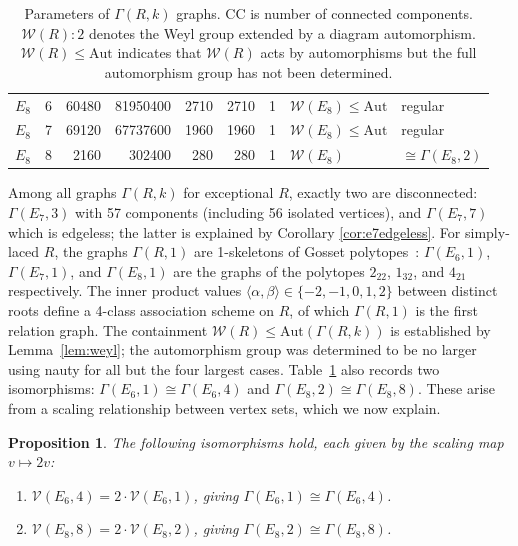 \documentclass[11pt]{article}
\newtheorem{proposition}[theorem]{Proposition}
\newcommand{\W}{\mathcal{W}}
\begin{document}
\begin{table}[h]
\begin{tabular}{llrrrrrll}
$E_8$ & 6 & 60480 & 81950400 & 2710 & 2710 & 1 & $\W(E_8) \leq \mathrm{Aut}$ & regular \\
$E_8$ & 7 & 69120 & 67737600 & 1960 & 1960 & 1 & $\W(E_8) \leq \mathrm{Aut}$ & regular \\
$E_8$ & 8 & 2160 & 302400 & 280 & 280 & 1 & $\W(E_8)$ & $\cong \Gamma(E_8, 2)$ \\
\bottomrule
\end{tabular}
\caption{Parameters of $\Gamma(R, k)$ graphs. CC is number of connected components. $\W(R){:}2$ denotes the Weyl group extended by a diagram automorphism. $\W(R) \leq \mathrm{Aut}$ indicates that $\W(R)$ acts by automorphisms but the full automorphism group has not been determined.}
\label{tab:properties}
\end{table}

Among all graphs $\Gamma(R,k)$ for exceptional $R$, exactly two are disconnected: $\Gamma(E_7, 3)$ with 57 components (including 56 isolated vertices), and $\Gamma(E_7, 7)$ which is edgeless; the latter is explained by Corollary \ref{cor:e7edgeless}. For simply-laced $R$, the graphs $\Gamma(R, 1)$ are 1-skeletons of Gosset polytopes~\cite{Coxeter}: $\Gamma(E_6, 1)$, $\Gamma(E_7, 1)$, and $\Gamma(E_8, 1)$ are the graphs of the polytopes $2_{22}$, $1_{32}$, and $4_{21}$ respectively. The inner product values $\langle \alpha, \beta \rangle \in \{-2, -1, 0, 1, 2\}$ between distinct roots define a 4-class association scheme on $R$, of which $\Gamma(R, 1)$ is the first relation graph. The containment $\W(R) \leq \mathrm{Aut}(\Gamma(R,k))$ is established by Lemma~\ref{lem:weyl}; the automorphism group was determined to be no larger using nauty for all but the four largest cases. Table~\ref{tab:properties} also records two isomorphisms: $\Gamma(E_6, 1) \cong \Gamma(E_6, 4)$ and $\Gamma(E_8, 2) \cong \Gamma(E_8, 8)$. These arise from a scaling relationship between vertex sets, which we now explain.

\begin{proposition}\label{prop:duality}
The following isomorphisms hold, each given by the scaling map $v \mapsto 2v$:
\begin{enumerate}
    \item $\mathcal{V}(E_6, 4) = 2 \cdot \mathcal{V}(E_6, 1)$, giving $\Gamma(E_6, 1) \cong \Gamma(E_6, 4)$.
    \item $\mathcal{V}(E_8, 8) = 2 \cdot \mathcal{V}(E_8, 2)$, giving $\Gamma(E_8, 2) \cong \Gamma(E_8, 8)$.
\end{enumerate}
\end{proposition}
\end{document}
